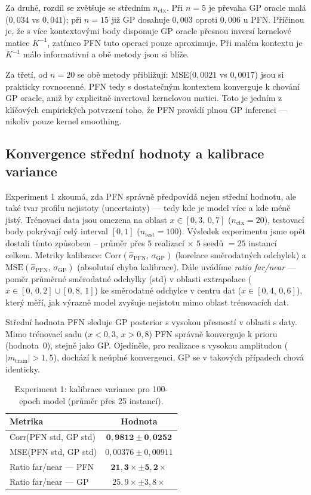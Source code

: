 Za druhé, rozdíl se zvětšuje se středním $n_{\text{ctx}}$.
Při $n = 5$ je převaha GP oracle malá ($0{,}034$ vs $0{,}041$); při $n = 15$ již GP dosahuje $0{,}003$ oproti $0{,}006$ u PFN.
Příčinou je, že s více kontextovými body disponuje GP oracle přesnou inversí kernelové matice $K^{-1}$, zatímco PFN tuto operaci pouze aproximuje.
Při malém kontextu je $K^{-1}$ málo informativní a obě metody jsou si blíže.

Za třetí, od $n = 20$ se obě metody přibližují: MSE($0{,}0021$ vs $0{,}0017$) jsou si prakticky rovnocenné.
PFN tedy s dostatečným kontextem konverguje k chování GP oracle, aniž by explicitně invertoval kernelovou matici.
Toto je jedním z klíčových empirických potvrzení toho, že PFN provádí plnou GP inferenci — nikoliv pouze kernel smoothing.

\subsection{Konvergence střední hodnoty a kalibrace variance}

Experiment 1 zkoumá, zda PFN správně předpovídá nejen střední hodnotu, ale také tvar profilu nejistoty (uncertainty) — tedy kde je model více a kde méně jistý.
Trénovací data jsou omezena na oblast $x \in [0{,}3,\, 0{,}7]$ ($n_{\text{ctx}} = 20$), testovací body pokrývají celý interval $[0, 1]$ ($n_{\text{test}} = 100$).
Výsledek experimentu jsme opět dostali tímto způsobem – průměr přes $5$ realizací $\times$ $5$ seedů $= 25$ instancí celkem.
Metriky kalibrace: $\text{Corr}(\hat{\sigma}_{\text{PFN}},\, \sigma_{\text{GP}})$ (korelace směrodatných odchylek) a $\text{MSE}(\hat{\sigma}_{\text{PFN}},\, \sigma_{\text{GP}})$ (absolutní chyba kalibrace).
Dále uvádíme \textit{ratio far/near} — poměr průměrné směrodatné odchylky (std) v oblasti extrapolace ($x \in [0,\, 0{,}2] \cup [0{,}8,\, 1]$) ke směrodatné odchylce v centru dat ($x \in [0{,}4,\, 0{,}6]$), který měří, jak výrazně model zvyšuje nejistotu mimo oblast trénovacích dat.
\par

Střední hodnota PFN sleduje GP posterior s vysokou přesností v oblasti s daty.
Mimo trénovací sadu ($x < 0{,}3$, $x > 0{,}8$) PFN správně konverguje k prioru (hodnota~$0$), stejně jako GP.
Ojediněle, pro realizace s vysokou amplitudou ($|m_{\text{train}}| > 1{,}5$), dochází k neúplné konvergenci, GP se v takových případech chová identicky.

\begin{table}[htbp]
\centering
\begin{tabular}{lc}
\hline
\textbf{Metrika} & \textbf{Hodnota} \\
\hline
Corr(PFN std, GP std) & $\mathbf{0{,}9812 \pm 0{,}0252}$ \\
MSE(PFN std, GP std) & $0{,}00376 \pm 0{,}00911$ \\
Ratio far/near — PFN & $\mathbf{21{,}3\times \pm 5{,}2\times}$ \\
Ratio far/near — GP  & $25{,}9\times \pm 3{,}8\times$ \\
\hline
\end{tabular}
\caption{Experiment 1: kalibrace variance pro 100-epoch model (průměr přes 25 instancí).}
\label{tab:exp1}
\end{table}

